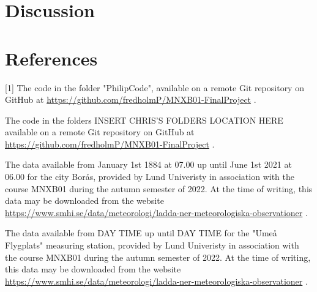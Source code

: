 \documentclass[a4, 12pt]{article}
\begin{document}
\section{Discussion}

\newpage
\section{References}
[1] The code in the folder "PhilipCode", available on a remote Git repository on GitHub at \href{https://github.com/fredholmP/MNXB01-FinalProject}{https://github.com/fredholmP/MNXB01-FinalProject} . \newline

\noindent [2] The code in the folders INSERT CHRIS'S FOLDERS LOCATION HERE available on a remote Git repository on GitHub at \href{https://github.com/fredholmP/MNXB01-FinalProject}{https://github.com/fredholmP/MNXB01-FinalProject} . \newline

\noindent [3] The data available from January 1st 1884 at 07.00 up until June 1st 2021 at 06.00 for the city Borås, provided by Lund Univeristy in association with the course MNXB01 during the autumn semester of 2022. At the time of writing, this data may be downloaded from the website \href{https://www.smhi.se/data/meteorologi/ladda-ner-meteorologiska-observationer}{https://www.smhi.se/data/meteorologi/ladda-ner-meteorologiska-observationer}  . \newline


\noindent [4] The data available from DAY TIME up until DAY TIME for the "Umeå Flygplats" measuring station, provided by Lund Univeristy in association with the course MNXB01 during the autumn semester of 2022. At the time of writing, this data may be downloaded from the website \href{https://www.smhi.se/data/meteorologi/ladda-ner-meteorologiska-observationer}{https://www.smhi.se/data/meteorologi/ladda-ner-meteorologiska-observationer} . 
\end{document}

